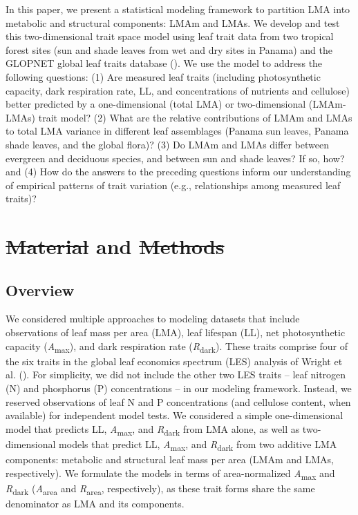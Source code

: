 \documentclass[
  12pt,
  letterpaper,
  DIV=11,
  numbers=noendperiod]{scrartcl}
\providecommand{\DIFadd}[1]{{\protect\color{blue}\uwave{#1}}} %
\providecommand{\DIFdel}[1]{{\protect\color{red}\sout{#1}}}                      %
\providecommand{\DIFaddbegin}{} %
\providecommand{\DIFaddend}{} %
\providecommand{\DIFdelbegin}{} %
\providecommand{\DIFdelend}{} %
\newcommand{\DIFscaledelfig}{0.5}
\newlength{\DIFdelgraphicswidth} %
\newlength{\DIFdelgraphicsheight} %
\newcommand{\DIFaddincludegraphics}[2][]{{\color{blue}\fbox{\DIFOincludegraphics[#1]{#2}}}} %
\newcommand{\DIFdelincludegraphics}[2][]{%
\sbox{\DIFdelgraphicsbox}{\DIFOincludegraphics[#1]{#2}}%
\settoboxwidth{\DIFdelgraphicswidth}{\DIFdelgraphicsbox} %
\settoboxtotalheight{\DIFdelgraphicsheight}{\DIFdelgraphicsbox} %
\scalebox{\DIFscaledelfig}{%
\parbox[b]{\DIFdelgraphicswidth}{\usebox{\DIFdelgraphicsbox}\\[-\baselineskip] \rule{\DIFdelgraphicswidth}{0em}}\llap{\resizebox{\DIFdelgraphicswidth}{\DIFdelgraphicsheight}{%
\setlength{\unitlength}{\DIFdelgraphicswidth}%
\begin{picture}(1,1)%
\thicklines\linethickness{2pt} %
{\color[rgb]{1,0,0}\put(0,0){\framebox(1,1){}}}%
{\color[rgb]{1,0,0}\put(0,0){\line( 1,1){1}}}%
{\color[rgb]{1,0,0}\put(0,1){\line(1,-1){1}}}%
\end{picture}%
}\hspace*{3pt}}} %
} %
\DeclareRobustCommand{\DIFaddbegin}{\DIFOaddbegin \let\includegraphics\DIFaddincludegraphics} %
\DeclareRobustCommand{\DIFaddend}{\DIFOaddend \let\includegraphics\DIFOincludegraphics} %
\DeclareRobustCommand{\DIFdelbegin}{\DIFOdelbegin \let\includegraphics\DIFdelincludegraphics} %
\DeclareRobustCommand{\DIFdelend}{\DIFOaddend \let\includegraphics\DIFOincludegraphics} %
\begin{document}
In this paper, we present a statistical modeling framework to partition
LMA into metabolic and structural components: LMAm and LMAs. We develop
and test this two-dimensional trait space model using leaf trait data
from two tropical forest sites (sun and shade leaves from wet and dry
sites in Panama) and the GLOPNET global leaf traits database
(). We use the model to
address the following questions: (1) Are measured leaf traits (including
photosynthetic capacity, dark respiration rate, LL, and concentrations
of nutrients and cellulose) better predicted by a one-dimensional (total
LMA) or two-dimensional (LMAm-LMAs) trait model? (2) What are the
relative contributions of LMAm and LMAs to total LMA variance in
different leaf assemblages (Panama sun leaves, Panama shade leaves, and
the global flora)? (3) Do LMAm and LMAs differ between evergreen and
deciduous species, and between sun and shade leaves? If so, how? and (4)
How do the answers to the preceding questions inform our understanding
of empirical patterns of trait variation (e.g., relationships among
measured leaf traits)?

\section{\DIFdelbegin \DIFdel{Material }\DIFdelend \DIFaddbegin \DIFadd{Materials }\DIFaddend and \DIFdelbegin \DIFdel{Methods}\DIFdelend \DIFaddbegin \DIFadd{methods}\DIFaddend }\DIFdelbegin %
\DIFdelend \DIFaddbegin \label{materials-and-methods}
\DIFaddend 

\subsection{Overview}\label{overview}

We considered multiple approaches to modeling datasets that include
observations of leaf mass per area (LMA), leaf lifespan (LL), net
photosynthetic capacity (\emph{A}\textsubscript{max}), and dark
respiration rate (\emph{R}\textsubscript{dark}). These traits comprise
four of the six traits in the global leaf economics spectrum (LES)
analysis of Wright et al. (). For
simplicity, we did not include the other two LES traits -- leaf nitrogen
(N) and phosphorus (P) concentrations -- in our modeling framework.
Instead, we reserved observations of leaf N and P concentrations (and
cellulose content, when available) for independent model tests. We
considered a simple one-dimensional model that predicts LL,
\emph{A}\textsubscript{max}, and \emph{R}\textsubscript{dark} from LMA
alone, as well as two-dimensional models that predict LL,
\emph{A}\textsubscript{max}, and \emph{R}\textsubscript{dark} from two
additive LMA components: metabolic and structural leaf mass per area
(LMAm and LMAs, respectively). We formulate the models in terms of
area-normalized \emph{A}\textsubscript{max} and
\emph{R}\textsubscript{dark} (\emph{A}\textsubscript{area} and
\emph{R}\textsubscript{area}, respectively), as these trait forms share
the same denominator as LMA and its components.
\end{document}
